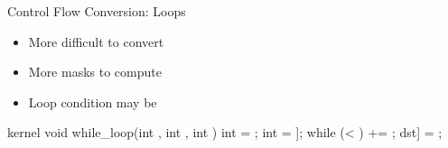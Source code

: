 \begin{frame}[fragile]{Control Flow Conversion: Loops}

\begin{minipage}[t]{0.45\linewidth}

\begin{itemize}
    \item More difficult to convert
    \item More masks to compute
    \item Loop condition may be 
\end{itemize}

\begin{codebox}[commandchars=\\\[\]]
kernel void while_loop(int \uniform[*src],
                       int \uniform[*dst],
                       int \uniform[step]) {
  int \varying[tid] = ;
  int \varying[x] = \uniform[src]\idx[\varying[tid]];
  while (\varying[x] < \uniform[0]) {
    \varying[x] += \uniform[step];
  }
  dst\idx[\varying[tid]] = \varying[x];
}
\end{codebox}

\end{minipage}
\hspace{1em}
\begin{minipage}[t]{0.43\linewidth}

\vspace{0.1ex}


\end{minipage}

\end{frame}

